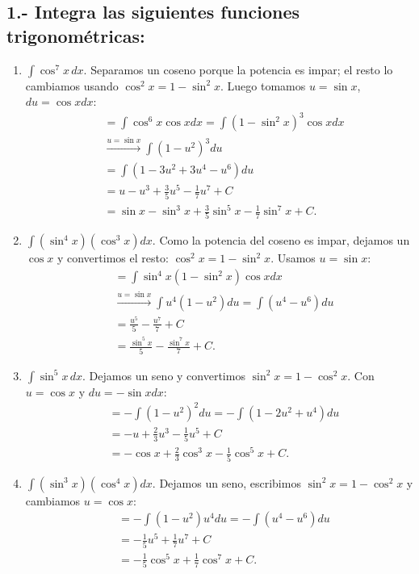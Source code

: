 \documentclass[12pt, letterpaper]{article}
\makeatletter
\renewcommand{\alph}[1]{\expandafter\@alphlatin\csname c@#1\endcsname}
\newcommand{\@alphlatin}[1]{\ifcase#1\or a\or b\or c\or d\or e\or f\or g\or h\or i\or j\or k\or l\or m\or n\or o\or p\or q\or r\or s\or t\or u\or v\or w\or x\or y\or z\else\@ctrerr\fi}
\makeatother
\begin{document}
\subsection{1.- Integra las siguientes funciones trigonométricas:}
\begin{enumerate}[label=\alph*)]
  \item $\displaystyle\int\cos^7x\,dx$. Separamos un coseno porque la potencia es impar; el resto lo cambiamos usando $\cos^2x=1-\sin^2x$. Luego tomamos $u=\sin x$, $du=\cos xdx$:
  \[
  \begin{aligned}
  &=\int\cos^6x\cos xdx=\int(1-\sin^2x)^3\cos xdx\\
  &\xrightarrow{u=\sin x}\int(1-u^2)^3du\\
  &=\int(1-3u^2+3u^4-u^6)du\\
  &=u-u^3+\frac35u^5-\frac17u^7+C\\
  &=\boxed{\sin x-\sin^3x+\frac35\sin^5x-\frac17\sin^7x+C}.
  \end{aligned}
  \]
  \item $\displaystyle\int(\sin^4x)(\cos^3x)dx$. Como la potencia del coseno es impar, dejamos un $\cos x$ y convertimos el resto: $\cos^2x=1-\sin^2x$. Usamos $u=\sin x$:
  \[
  \begin{aligned}
  &=\int\sin^4x(1-\sin^2x)\cos xdx\\
  &\xrightarrow{u=\sin x}\int u^4(1-u^2)du=\int(u^4-u^6)du\\
  &=\frac{u^5}{5}-\frac{u^7}{7}+C\\
  &=\boxed{\frac{\sin^5x}{5}-\frac{\sin^7x}{7}+C}.
  \end{aligned}
  \]
  \item $\displaystyle\int\sin^5x\,dx$. Dejamos un seno y convertimos $\sin^2x=1-\cos^2x$. Con $u=\cos x$ y $du=-\sin xdx$:
  \[
  \begin{aligned}
  &=-\int(1-u^2)^2du=-\int(1-2u^2+u^4)du\\
  &=-u+\frac23u^3-\frac15u^5+C\\
  &=\boxed{-\cos x+\frac23\cos^3x-\frac15\cos^5x+C}.
  \end{aligned}
  \]
  \item $\displaystyle\int(\sin^3x)(\cos^4x)dx$. Dejamos un seno, escribimos $\sin^2x=1-\cos^2x$ y cambiamos $u=\cos x$:
  \[
  \begin{aligned}
  &=-\int(1-u^2)u^4du=-\int(u^4-u^6)du\\
  &=-\frac15u^5+\frac17u^7+C\\
  &=\boxed{-\frac15\cos^5x+\frac17\cos^7x+C}.
  \end{aligned}
\]
\end{enumerate}
\end{document}

